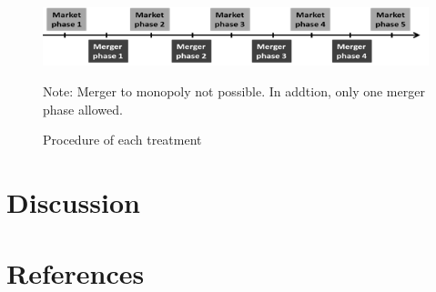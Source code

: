 \documentclass{article}
\begin{document}
\blindtext

\begin{figure} [!h]
	\caption{Procedure of each treatment}
 	\begin{centering}
		\includegraphics[width=0.8\linewidth]{phases} \\
	\end{centering}
	\footnotesize Note: Merger to monopoly not possible. In addtion, only one merger phase allowed. 
\end{figure}

\newpage

\section{Discussion}
\blindtext
\newpage







\section{References}
\begingroup
\renewcommand{\section}[2]{}
\nocite{*}
\printbibliography
\endgroup

\newpage
\end{document}
